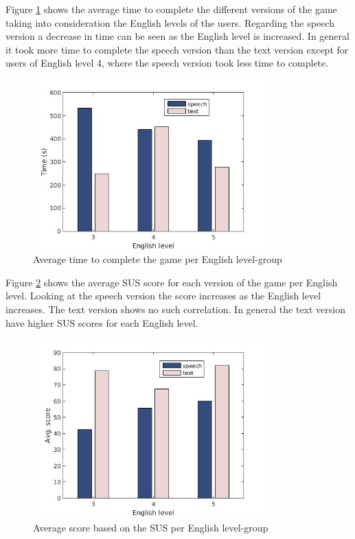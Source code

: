 \newpage
Figure \ref{eng_time} shows the average time to complete the different versions of the game taking into consideration the English levels of the users. Regarding the speech version a decrease in time can be seen as the English level is increased. In general it took more time to complete the speech version than the text version except for users of English level 4, where the speech version took less time to complete.

\begin{figure}[H]
  \centering
  \includegraphics[width=0.8\textwidth]{images/english_time.jpg}
  \caption{Average time to complete the game per English level-group}\label{eng_time}
\end{figure}

\newpage
Figure \ref{eng_score} shows the average SUS score for each version of the game per English level. Looking at the speech version the score increases as the English level increases. The text version shows no such correlation. In general the text version have higher SUS scores for each English level.

\begin{figure}[H]
  \centering
  \includegraphics[width=0.8\textwidth]{images/english_score.jpg}
  \caption{Average score based on the SUS per English level-group}\label{eng_score}
\end{figure}

